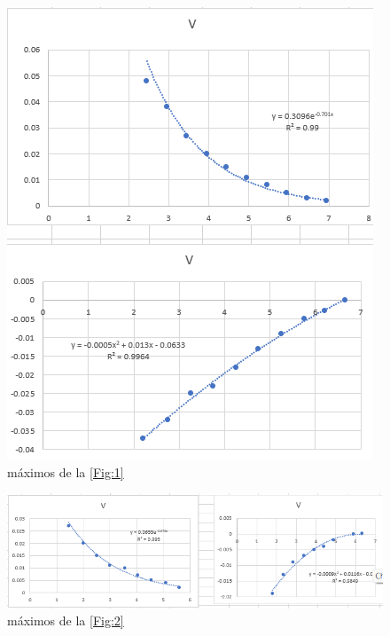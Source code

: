 \documentclass{article}
\begin{document}
\begin{figure}[H]
   \centering
   \includegraphics[scale=0.7]{../imgs/maxf.png}
   \caption{máximos de la \ref{Fig:1}}
   \label{Fig:3}
\end{figure}

\begin{figure}[H]
   \centering
   \includegraphics[scale=0.7]{../imgs/maxf0.png}
   \caption{máximos de la \ref{Fig:2}}
   \label{Fig:4}
\end{figure}
\end{document}
